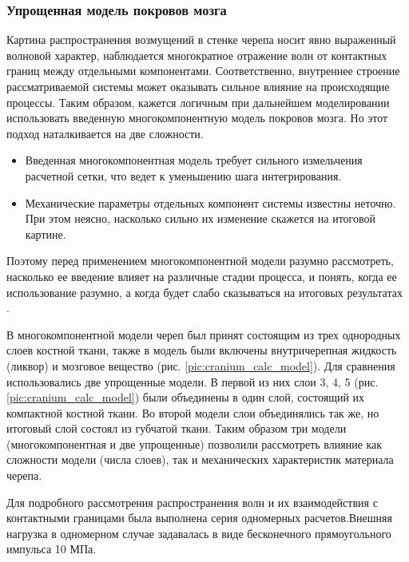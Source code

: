 \clearpage
\newpage

\subsubsection*{Упрощенная модель покровов мозга}

Картина распространения возмущений в стенке черепа носит явно выраженный волновой характер, наблюдается многократное отражение волн от контактных границ между отдельными компонентами. Соответственно, внутреннее строение рассматриваемой системы может оказывать сильное влияние на происходящие процессы. Таким образом, кажется логичным при дальнейшем моделировании использовать введенную многокомпонентную модель покровов мозга. Но этот подход наталкивается на две сложности.

\begin{itemize}

\item Введенная многокомпонентная модель требует сильного измельчения расчетной сетки, что ведет к уменьшению шага интегрирования.

\item Механические параметры отдельных компонент системы известны неточно. При этом неясно, насколько сильно их изменение скажется на итоговой картине.

\end{itemize}

Поэтому перед применением многокомпонентной модели разумно рассмотреть, насколько ее введение влияет на различные стадии процесса, и понять, когда ее использование разумно, а когда будет слабо сказываться на итоговых результатах \cite{a3}.

В многокомпонентной модели череп был принят состоящим из трех однородных слоев костной ткани, также в модель были включены внутричерепная жидкость (ликвор) и мозговое вещество (рис. \ref{pic:cranium_calc_model}). Для сравнения использовались две упрощенные модели. В первой из них слои 3, 4, 5 (рис. \ref{pic:cranium_calc_model}) были объединены в один слой, состоящий их компактной костной ткани. Во второй модели слои объединялись так же, но итоговый слой состоял из губчатой ткани. Таким образом три модели (многокомпонентная и две упрощенные) позволили рассмотреть влияние как сложности модели (числа слоев), так и механических характеристик материала черепа.

Для подробного рассмотрения распространения волн и их взаимодействия с контактными границами была выполнена серия одномерных расчетов.Внешняя нагрузка в одномерном случае задавалась в виде бесконечного прямоугольного импульса 10 МПа.


